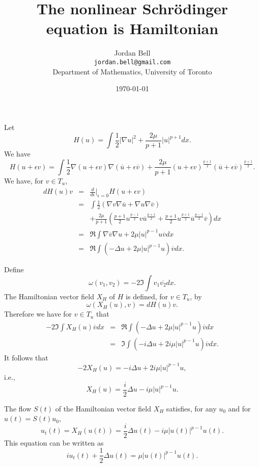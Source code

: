 \documentclass{article}
\begin{document}
\title{The nonlinear Schr\"odinger equation is Hamiltonian}
\author{Jordan Bell\\ \texttt{jordan.bell@gmail.com}\\Department of Mathematics, University of Toronto}
\date{\today}
\maketitle

Let
\[
H(u)=\int \frac{1}{2}|\nabla u|^2+\frac{2\mu}{p+1}|u|^{p+1}dx.
\]
We have
\[
H(u+\epsilon v)=
\int \frac{1}{2} \nabla (u+\epsilon v) \nabla (\overline{u}+\epsilon \overline{v})+
\frac{2\mu}{p+1} (u+\epsilon v)^{\frac{p+1}{2}} (\overline{u}+\epsilon \overline{v})^{\frac{p+1}{2}}.
\]
We have, for $v \in T_u$,
\begin{eqnarray*}
dH(u)v&=&\frac{d}{d\epsilon}|_{\epsilon=0} H(u+\epsilon v)\\
&=&\int \frac{1}{2}\left( \nabla v \nabla \overline{u}+\nabla u \nabla \overline{v} \right)\\
&&+\frac{2\mu}{p+1}\left( \frac{p+1}{2} u^{\frac{p-1}{2}}v \overline{u}^{\frac{p+1}{2}}
+\frac{p+1}{2}u^{\frac{p+1}{2}} \overline{u}^{\frac{p-1}{2}}\overline{v} \right) dx\\
&=&\Re\int \nabla \overline{v} \nabla u+2\mu|u|^{p-1} u \overline{v} dx\\
&=&\Re \int \left(-\Delta u+2\mu|u|^{p-1} u\right) \overline{v} dx.
\end{eqnarray*}

Define
\[
\omega(v_1,v_2)=-2 \Im \int v_1 \overline{v_2} dx.
\]
The Hamiltonian vector field $X_H$ of $H$ is defined, for $v \in T_u$, by
\[
\omega(X_H(u),v)=dH(u)v.
\]
Therefore we have  for $v \in T_u$ that
\begin{eqnarray*}
-2\Im \int X_H(u) \overline{v} dx&=&\Re \int \left(-\Delta u+2\mu|u|^{p-1} u\right) \overline{v} dx\\
&=&\Im \int \left(-i\Delta u+2i\mu |u|^{p-1} u\right) \overline{v} dx.
\end{eqnarray*}
It follows that
\[
-2X_H(u)=-i\Delta u+2i\mu |u|^{p-1} u,
\]
i.e.,
\[
X_H(u)=\frac{i}{2}\Delta u-i\mu  |u|^{p-1} u.
\]

The flow $S(t)$ of the Hamiltonian vector field $X_H$ satisfies, for any $u_0$ and for $u(t)=S(t)u_0$,
\[
u_t(t) = X_H(u(t))=\frac{i}{2}\Delta u(t)-i\mu  |u(t)|^{p-1} u(t).
\] 
This equation can be written as
\[
iu_t(t)+\frac{1}{2} \Delta u(t)=\mu  |u(t)|^{p-1} u(t).
\]
\end{document}
